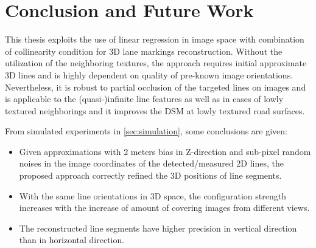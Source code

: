
\chapter{Conclusion and Future Work}
\label{chap:conclusion}

This thesis exploits the use of linear regression in image space with combination of collinearity condition for 3D lane markings reconstruction. Without the utilization of the neighboring textures, the approach requires initial approximate 3D lines and is highly dependent on quality of pre-known image orientations. Nevertheless, it is robust to partial occlusion of the targeted lines on images and is applicable to the (quasi-)infinite line features as well as in cases of lowly textured neighborings and it improves the DSM at lowly textured road surfaces. 

From simulated experiments in \cref{sec:simulation}, some conclusions are given:
\begin{itemize}
	\item Given approximations with 2 meters bias in Z-direction and sub-pixel random noises in the image coordinates of the detected/measured 2D lines, the proposed approach correctly refined the 3D positions of line segments.
	
	\item With the same line orientations in 3D space, the configuration strength increases with the increase of amount of covering images from different views.
	
	\item The reconstructed line segments have higher precision in vertical direction than in horizontal direction.
\end{itemize}


